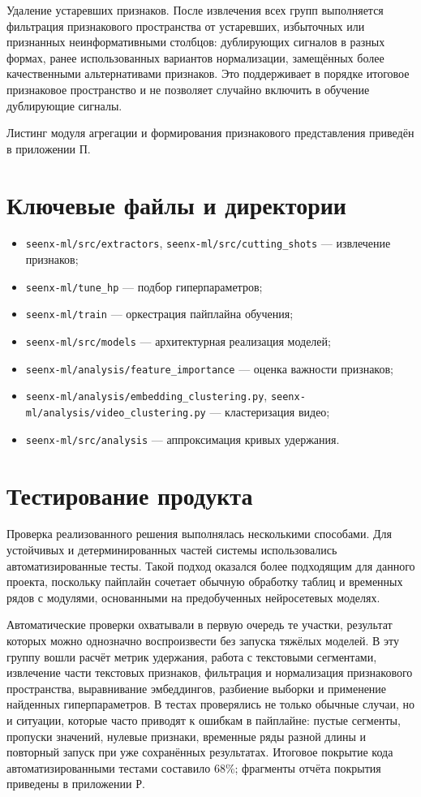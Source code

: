 \documentclass[times]{itmo-student-thesis}
\begin{document}
Удаление устаревших признаков. После извлечения всех групп выполняется фильтрация признакового пространства от устаревших, избыточных или признанных неинформативными столбцов: дублирующих сигналов в разных формах, ранее использованных вариантов нормализации, замещённых более качественными альтернативами признаков. Это поддерживает в порядке итоговое признаковое пространство и не позволяет случайно включить в обучение дублирующие сигналы.

Листинг модуля агрегации и формирования признакового представления приведён в приложении П.

\section{Ключевые файлы и директории}

\begin{itemize}[label=\textbf{\textbullet},leftmargin=1.25cm]
    \item \texttt{seenx-ml/src/extractors}, \texttt{seenx-ml/src/cutting\_shots} — извлечение признаков;
    \item \texttt{seenx-ml/tune\_hp} — подбор гиперпараметров;
    \item \texttt{seenx-ml/train} — оркестрация пайплайна обучения;
    \item \texttt{seenx-ml/src/models} — архитектурная реализация моделей;
    \item \texttt{seenx-ml/analysis/feature\_importance} — оценка важности признаков;
    \item \texttt{seenx-ml/analysis/embedding\_clustering.py}, \texttt{seenx-ml/analysis/video\_clustering.py} — кластеризация видео;
    \item \texttt{seenx-ml/src/analysis} — аппроксимация кривых удержания.
\end{itemize}

\section{Тестирование продукта}

Проверка реализованного решения выполнялась несколькими способами. Для устойчивых и детерминированных частей системы использовались автоматизированные тесты. Такой подход оказался более подходящим для данного проекта, поскольку пайплайн сочетает обычную обработку таблиц и временных рядов с модулями, основанными на предобученных нейросетевых моделях.

Автоматические проверки охватывали в первую очередь те участки, результат которых можно однозначно воспроизвести без запуска тяжёлых моделей. В эту группу вошли расчёт метрик удержания, работа с текстовыми сегментами, извлечение части текстовых признаков, фильтрация и нормализация признакового пространства, выравнивание эмбеддингов, разбиение выборки и применение найденных гиперпараметров. В тестах проверялись не только обычные случаи, но и ситуации, которые часто приводят к ошибкам в пайплайне: пустые сегменты, пропуски значений, нулевые признаки, временные ряды разной длины и повторный запуск при уже сохранённых результатах. Итоговое покрытие кода автоматизированными тестами составило 68\%; фрагменты отчёта покрытия приведены в приложении Р.
\end{document}
